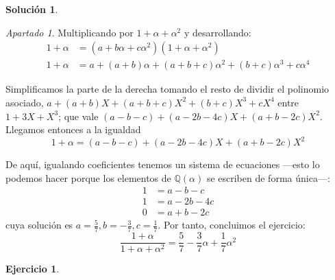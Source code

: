 \documentclass[a4paper, 11pt]{article}
\theoremstyle{definition}
\newtheorem{ejercicio}{Ejercicio}
\newtheorem*{solucion}{Solución}
\theoremstyle{remark}
\newtheorem{apartado}{Apartado}[ejercicio]
\begin{document}
\begin{solucion}
\begin{apartado}
          Multiplicando por $1 + \alpha + \alpha^2$ y desarrollando:
          \begin{align*}
              1 + \alpha &= (a + b\alpha + c\alpha^2)(1 + \alpha + \alpha^2) \\
              1 + \alpha &= a + (a+b)\alpha + (a+b+c)\alpha^2 + (b+c)\alpha^3 + c\alpha^4
          \end{align*}

          Simplificamos la parte de la derecha tomando el resto de dividir el polinomio asociado, $ a + (a+b)X + (a+b+c)X^2 + (b+c)X^3 + cX^4$ entre $1+3X+X^3$; que vale $(a-b-c) + (a-2b-4c)X + (a+b-2c)X^2$. Llegamos entonces a la igualdad
          \[
          1 + \alpha = (a-b-c) + (a-2b-4c)X + (a+b-2c)X^2
          \]

          De aquí, igualando coeficientes tenemos un sistema de ecuaciones ---esto lo podemos hacer porque los elementos de $\mathbb{Q}(\alpha)$ se escriben de forma única---:
          \begin{align*}
              1 &= a-b-c \\
              1 &= a-2b-4c \\
              0 &= a+b-2c
          \end{align*}
          cuya solución es $a = \frac{5}{7}, b = -\frac{3}{7}, c = \frac{1}{7}$. Por tanto, concluimos el ejercicio:
          \[
          \frac{1+\alpha}{1+\alpha+\alpha^2} = \frac{5}{7} - \frac{3}{7}\alpha + \frac{1}{7}\alpha^2
          \]
      \end{apartado}
  \end{solucion}

  \begin{ejercicio}
  \end{ejercicio}
\end{document}
